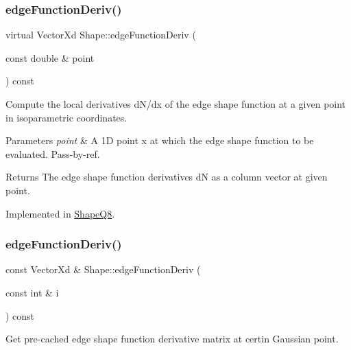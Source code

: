 \subsubsection{\texorpdfstring{edge\+Function\+Deriv()}{edgeFunctionDeriv()}\hspace{0.1cm}{\footnotesize\ttfamily [1/2]}}
{\footnotesize\ttfamily virtual Vector\+Xd Shape\+::edge\+Function\+Deriv (\begin{DoxyParamCaption}\item[{const double \&}]{point }\end{DoxyParamCaption}) const\hspace{0.3cm}{\ttfamily [pure virtual]}}



Compute the local derivatives d\+N/dx of the edge shape function at a given point in isoparametric coordinates. 


\begin{DoxyParams}{Parameters}
{\em point} & A 1D point x at which the edge shape function to be evaluated. Pass-\/by-\/ref. \\
\hline
\end{DoxyParams}
\begin{DoxyReturn}{Returns}
The edge shape function derivatives dN as a column vector at given point. 
\end{DoxyReturn}


Implemented in \mbox{\hyperlink{class_shape_q8_a81582d03b2fc79a8a5705111ad85163f}{Shape\+Q8}}.

\mbox{\label{class_shape_adb82ef67f86561caa0cebdb4abb7342a}} 
\subsubsection{\texorpdfstring{edge\+Function\+Deriv()}{edgeFunctionDeriv()}\hspace{0.1cm}{\footnotesize\ttfamily [2/2]}}
{\footnotesize\ttfamily const Vector\+Xd \& Shape\+::edge\+Function\+Deriv (\begin{DoxyParamCaption}\item[{const int \&}]{i }\end{DoxyParamCaption}) const}



Get pre-\/cached edge shape function derivative matrix at certin Gaussian point. 


